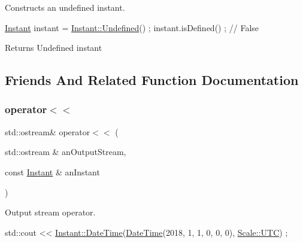 Constructs an undefined instant. 


\begin{DoxyCode}
\hyperlink{classostk_1_1physics_1_1time_1_1_instant_a132c1e4b2fe9a9a671109206e297bd5d}{Instant} instant = \hyperlink{classostk_1_1physics_1_1time_1_1_instant_a0c95c97e9aa17863aecf8c9ebc821c0b}{Instant::Undefined}() ;
instant.isDefined() ; \textcolor{comment}{// False}
\end{DoxyCode}


\begin{DoxyReturn}{Returns}
Undefined instant 
\end{DoxyReturn}


\subsection{Friends And Related Function Documentation}
\mbox{\label{classostk_1_1physics_1_1time_1_1_instant_a01668796f6ebfd8c23c2d0df17f00b65}} 
\subsubsection{\texorpdfstring{operator$<$$<$}{operator<<}}
{\footnotesize\ttfamily std\+::ostream\& operator$<$$<$ (\begin{DoxyParamCaption}\item[{std\+::ostream \&}]{an\+Output\+Stream,  }\item[{const \hyperlink{classostk_1_1physics_1_1time_1_1_instant}{Instant} \&}]{an\+Instant }\end{DoxyParamCaption})\hspace{0.3cm}{\ttfamily [friend]}}



Output stream operator. 


\begin{DoxyCode}
std::cout << \hyperlink{classostk_1_1physics_1_1time_1_1_instant_afd5725574a02389b80fad4baff313c8a}{Instant::DateTime}(\hyperlink{classostk_1_1physics_1_1time_1_1_instant_afd5725574a02389b80fad4baff313c8a}{DateTime}(2018, 1, 1, 0, 0, 0), 
      \hyperlink{namespaceostk_1_1physics_1_1time_adf23d37bd8641fb76a0e98ab46a70df7a9234324ddf6b4176b57d803a925b7961}{Scale::UTC}) ;
\end{DoxyCode}



